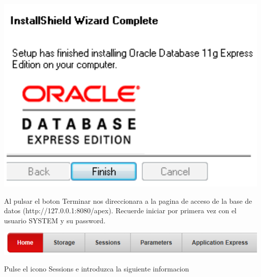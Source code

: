 \documentclass[12pt,letterpaper]{article}
\begin{document}
\begin{center}
\includegraphics[width=15cm]{./IMG/img29}
\end{center}
Al pulsar el boton Terminar nos direccionara a la pagina de acceso de la base de datos (http://127.0.0.1:8080/apex). Recuerde iniciar por primera vez con el usuario SYSTEM y su password.
\begin{center}
\includegraphics[width=15cm]{./IMG/img30}
\end{center}
Pulse el icono Sessions e introduzca la siguiente informacion
\end{document}
